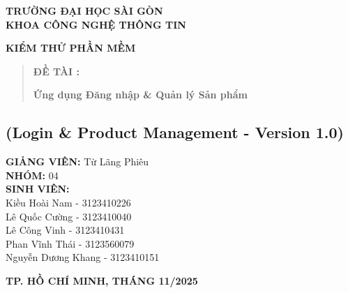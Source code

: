 \documentclass[a4paper,12pt]{article}
\begin{document}
\begin{titlepage}
    \centering
    \textbf{TRƯỜNG ĐẠI HỌC SÀI GÒN}\\
    \textbf{KHOA CÔNG NGHỆ THÔNG TIN}
    
    \vspace{2cm}
    
    {\Huge \textbf{KIỂM THỬ PHẦN MỀM}}
    
    \vspace{1cm}
    
    \vspace{1cm}
    \begin{quote}
    \textbf{ĐỀ TÀI :}
    
    \textbf{Ứng dụng Đăng nhập \& Quản lý Sản phẩm}
    \end{quote}
    
    \subsection*{(Login \& Product Management - Version 1.0)}
    
    \vspace{2cm}
    
    \begin{flushleft}
    \textbf{GIẢNG VIÊN:} Từ Lãng Phiêu \\
    \textbf{NHÓM:} 04 \\
    \textbf{SINH VIÊN:} \\
    Kiều Hoài Nam - 3123410226 \\
    Lê Quốc Cường - 3123410040 \\
    Lê Công Vinh - 3123410431 \\
    Phan Vĩnh Thái - 3123560079 \\
    Nguyễn Dương Khang - 3123410151
    \end{flushleft}
    
    \vfill
    \centering
    \textbf{TP. HỒ CHÍ MINH, THÁNG 11/2025}
\end{titlepage}

\newpage
\tableofcontents
\newpage

\end{document}
